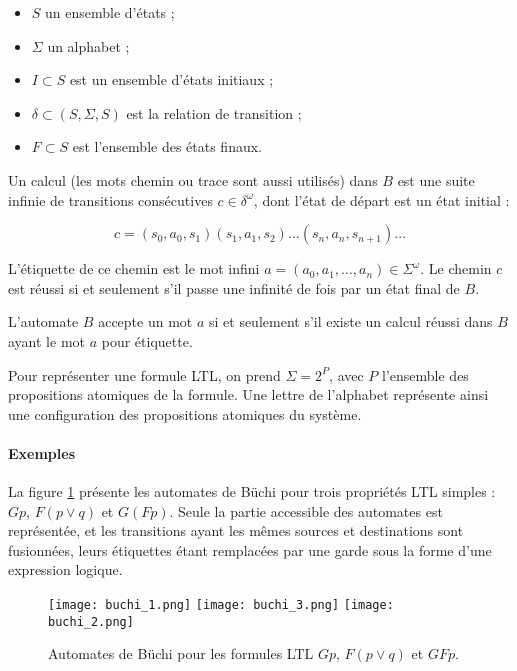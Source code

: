 \begin{itemize}
\item
  \(S\) un ensemble d'états ;
\item
  \(\Sigma\) un alphabet ;
\item
  \(I \subset S\) est un ensemble d'états initiaux ;
\item
  \(\delta \subset (S, \Sigma, S)\) est la relation de transition ;
\item
  \(F \subset S\) est l'ensemble des états finaux.
\end{itemize}

Un calcul (les mots chemin ou trace sont aussi utilisés) dans \(B\) est une
suite infinie de transitions consécutives \(c \in \delta^\omega\), dont l'état
de départ est un état initial :

\[
c = (s_0, a_0, s_1)(s_1, a_1, s_2)\dots(s_n, a_n, s_{n+1})\dots
\]

L'étiquette de ce chemin est le mot infini \(a = (a_0, a_1, \dots, a_n) \in
\Sigma^\omega\). Le chemin \(c\) est réussi si et seulement s’il passe une
infinité de fois par un état final de \(B\).

L'automate \(B\) accepte un mot \(a\) si et seulement s’il existe un calcul réussi dans \(B\) ayant le mot \(a\) pour étiquette.

Pour représenter une formule \ac{LTL}, on prend \(\Sigma = 2^P\), avec \(P\)
l'ensemble des propositions atomiques de la formule. Une lettre de
l'alphabet représente ainsi une configuration des propositions atomiques
du système.

\paragraph{Exemples}

La figure \ref{fig:buchi_example} présente les automates de Büchi pour trois propriétés
\ac{LTL} simples : \(Gp\), \(F(p \lor q)\) et \(G(Fp)\). Seule la partie accessible des automates
est représentée, et les transitions ayant les mêmes sources et destinations sont fusionnées,
leurs étiquettes étant remplacées par une garde sous la forme d'une expression logique.

\begin{figure}
\begin{center}
\texttt{[image: buchi\_1.png]}
\texttt{[image: buchi\_3.png]}
\texttt{[image: buchi\_2.png]}
\end{center}
\caption{Automates de Büchi pour les formules LTL $G p$, $F(p \lor q)$ et
$GF p$.}
\label{fig:buchi_example}
\end{figure}

